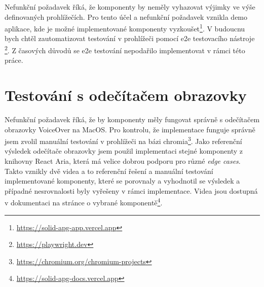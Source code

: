 Nefunkční požadavek \hyperref[nfr11]{} říká, že komponenty by neměly vyhazovat výjimky ve výše definovaných prohlížečích.
Pro tento účel a nefunkční požadavek \hyperref[nfr15]{} vznikla demo aplikace, kde je možné implementované komponenty vyzkoušet\footnote{\url{https://solid-apg-app.vercel.app}}.
V budoucnu bych chtěl zautomatizovat testování v prohlížeči pomocí \gls{e2e} testovacího nástroje \footnote{\url{https://playwright.dev}}.
Z časových důvodů se \gls{e2e} testování nepodařilo implementovat v rámci této práce.

\section{Testování s odečítačem obrazovky}

Nefunkční požadavek \hyperref[nfr12]{} říká, že by komponenty měly fungovat správně s odečítačem obrazovky VoiceOver na MacOS.
Pro kontrolu, že implementace funguje správně jsem zvolil manuální testování v prohlížeči na bázi chromia\footnote{\url{https://chromium.org/chromium-projects}}.
Jako referenční výsledek odečítače obrazovky jsem použil implementaci stejné komponenty z knihovny React Aria, která má velice dobrou podporu pro různé \textit{edge cases}.
Takto vznikly dvě videa a to referenční řešení a manuální testování implementované komponenty, které se porovnaly a vyhodnotil se výsledek a případné nesrovnalosti byly vyřešeny v rámci implementace.
Videa jsou dostupná v dokumentaci na stránce o vybrané komponentě\footnote{\url{https://solid-apg-docs.vercel.app}}.
